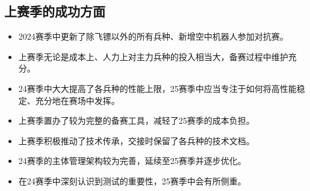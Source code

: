 \subsection{上赛季的成功方面}


    \begin{itemize}
        \item 2024赛季中更新了除飞镖以外的所有兵种、新增空中机器人参加对抗赛。
        \item 上赛季无论是成本上、人力上对主力兵种的投入相当大，备赛过程中维护充分。
        \item 24赛季中大大提高了各兵种的性能上限，25赛季中应当专注于如何将高性能稳定、充分地在赛场中发挥。
        \item 上赛季置办了较为完整的备赛工具，减轻了25赛季的成本负担。
        \item 上赛季积极推动了技术传承，交接时保留了各兵种的技术文档。
        \item 24赛季的主体管理架构较为完善，延续至25赛季并逐步优化。
        \item 在24赛季中深刻认识到测试的重要性，25赛季中会有所侧重。
    \end{itemize}